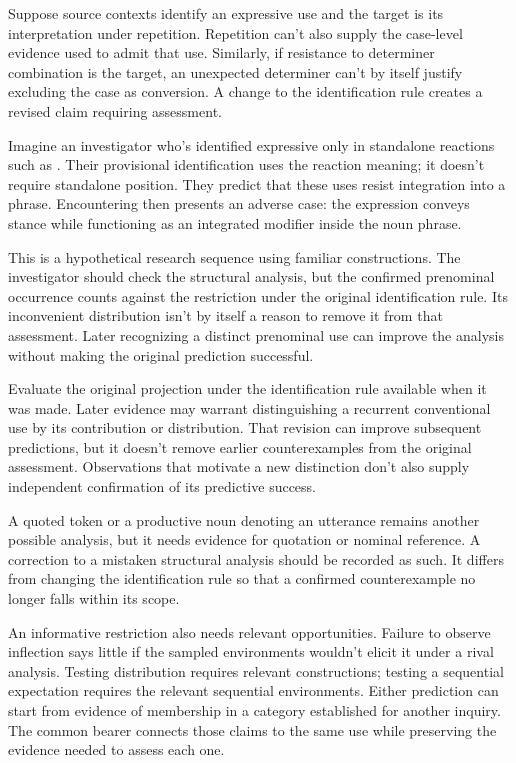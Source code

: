 \documentclass[12pt]{article}
\begin{document}
Suppose source contexts identify an expressive use and the target is
its interpretation under repetition. Repetition can't also supply the
case-level evidence used to admit that use. Similarly, if resistance
to determiner combination is the target, an unexpected determiner
can't by itself justify excluding the case as conversion. A change
to the identification rule creates a revised claim requiring assessment.

Imagine an investigator who's identified expressive 
only in standalone reactions such as . Their provisional identification uses the reaction meaning;
it doesn't require standalone position. They predict that these uses
resist integration into a phrase. Encountering  then presents an adverse case: the expression conveys stance
while functioning as an integrated modifier inside the noun phrase.

This is a hypothetical research sequence using familiar constructions.
The investigator should check the structural analysis, but the confirmed
prenominal occurrence counts against the restriction under the original
identification rule. Its inconvenient distribution isn't by itself a
reason to remove it from that assessment. Later recognizing a distinct
prenominal use can improve the analysis without making the original
prediction successful.

Evaluate the original projection under the identification rule available
when it was made. Later evidence may warrant distinguishing a recurrent
conventional use by its contribution or distribution. That revision
can improve subsequent predictions, but it doesn't remove earlier
counterexamples from the original assessment. Observations that motivate
a new distinction don't also supply independent confirmation of its
predictive success.

A quoted token or a productive noun denoting an utterance remains
another possible analysis, but it needs evidence for quotation or
nominal reference. A correction to a mistaken structural analysis should
be recorded as such. It differs from changing the identification rule
so that a confirmed counterexample no longer falls within its scope.

An informative restriction also needs relevant opportunities. Failure
to observe inflection says little if the sampled environments wouldn't
elicit it under a rival analysis. Testing distribution requires relevant
constructions; testing a sequential expectation requires the relevant
sequential environments. Either prediction can start from evidence
of membership in a category established for another inquiry. The common
bearer connects those claims to the same use while preserving the
evidence needed to assess each one.
\end{document}
